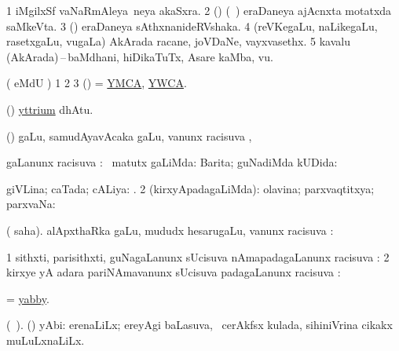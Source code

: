 \bentry
{} 
\gl{\nA} 
\bmng
\bnum
\num{1} iMgilxSf vaNaRmAleya \,neya akaSxra. 
\num{2} (\biVga) (\sA\ )  eraDaneya ajAcnxta motatxda saMkeVta. 
\num{3} (\jAyx) eraDaneya sAthxnanideRVshaka. 
\num{4} (reVKegaLu, naLikegaLu, rasetxgaLu, \mo vugaLa)  AkArada racane, joVDaNe, vayxvasethx. 
\num{5} kavalu (AkArada)\,--\,baMdhani, hiDikaTuTx, Asare kaMba, 
\enum
\mo vu.
\emng
\eentry

\bentry
{} 
\gl{\saMkiSx}
\bmng
( eMdU \parx) 
\bnum
\num{1}  
\num{2}  
\num{3} (\ame) = \hyperlink{YMCA}{YMCA}, \hyperlink{YWCA}{YWCA}.
\enum
\emng
\eentry

\bentry
{} 
\gl{\saMkeV}  
\bmng
(\ravi) \hyperlink{yttrium}{yttrium} dhAtu.
\emng
\eentry

\bentry
{} 
\gl{\saMkiSx} 
\bmng
{}
\emng
\eentry

\bentry
{} 
\gl{}   
\bmng
\pUparx (\pArxparx) \BUkaq gaLu, samudAyavAcaka \nA gaLu, \mo vanunx racisuva \pUparx, \udA\   
\emng
\eentry

\bentry
{}  
\gl{\uparx}
\bmng
\gu gaLanunx racisuva \uparx: 
\bnum
{} \nA\ matutx \gu gaLiMda: 
\banum
{} Barita; guNadiMda kUDida:  

  giVLina; caTada; cALiya: . 
\eanum
\numie
\num{2} (kirxyApadagaLiMda): olavina; parxvaqtitxya; parxvaNa: 
\enum
\emng
\eentry

\bentry
{} 
\gl{\uparx} 
\bmng
( saha). alApxthaRka \nA gaLu, mududx hesarugaLu, \mo vanunx racisuva \uparx: 
\emng
\eentry

\bentry
{} 
\gl{\uparx}
\bmng
\bnum
\num{1} sithxti, parisithxti, guNagaLanunx sUcisuva  nAmapadagaLanunx racisuva \uparx:   
\num{2} kirxye yA adara pariNAmavanunx sUcisuva padagaLanunx racisuva \uparx: 
\enum
\emng
\eentry


\bentry
{} 
\gl{\nA}
\bmng
= \hyperlink{yabby}{yabby}.
\emng
\eentry

\bentry
{} 
\gl{\nA} 
\bmng
(\bava\ ). (\AseTxrXV) yAbi:
\banum
{}  erenaLiLx; ereyAgi baLasuva, \kanmu\ cerAkfsx kulada, sihiniVrina  cikakx muLuLxnaLiLx. 

